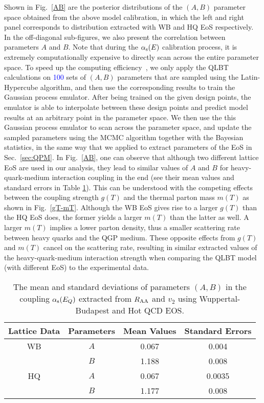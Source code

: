 \documentclass[aps,superscriptaddress,prc,twocolumn,nofootinbib]{revtex4}
\begin{document}
Shown in Fig.~\ref{AB} are the posterior distributions of the $(A, B)$ parameter space obtained from the above model calibration, in which the left and right panel corresponds to distribution extracted with WB and HQ EoS respectively. In the off-diagonal sub-figures, we also present the correlation between parameters $A$ and $B$.
Note that during the $\alpha_{\rm s}(E)$ calibration process, it is extremely computationally expensive to directly scan across the entire parameter space.
To speed up the computing efficiency~\cite{He:2018gks,Cao:2021keo}, we only apply the QLBT calculations on \textcolor{blue}{100} sets of $(A, B)$ parameters that are sampled using the Latin-Hypercube algorithm, and then use the corresponding results to train the Gaussian process emulator. After being trained on the given design points, the emulator is able to interpolate between these design points and predict model results at an arbitrary point in the parameter space.
We then use the this Gaussian process emulator to scan across the parameter space, and update the sampled parameters using the MCMC algorithm together with the Bayesian statistics, in the same way that we applied to extract parameters of the EoS in Sec.~\ref{sec:QPM}.
In Fig.~\ref{AB}, one can observe that although two different lattice EoS are used in our analysis, they lead to similar values of $A$ and $B$ for heavy-quark-medium interaction coupling in the end (see their mean values and standard errors in Table \ref{tab:4}). This can be understood with the competing effects between the coupling strength $g(T)$ and the thermal parton mass $m(T)$ as shown in Fig.~\ref{gT-mT}. Although the WB EoS gives rise to a larger $g(T)$ than the HQ EoS does, the former yields a larger $m(T)$ than the latter as well. A larger $m(T)$ implies a lower parton density, thus a smaller scattering rate between heavy quarks and the QGP medium. These opposite effects from $g(T)$ and $m(T)$ cancel on the scattering rate, resulting in similar extracted values of the heavy-quark-medium interaction strength when comparing the QLBT model (with different EoS) to the experimental data.



\begin{table}[htb]
\label{tab:4}
\centering
\vspace{-5pt}
\begin{tabular}{c|c|c|c}
 \hline
 Lattice Data & Parameters & Mean Values & Standard Errors  \\
 \hline
  WB   & $A$ & 0.067 & 0.004   \\
      & $B$ & 1.188 & 0.008   \\ \hline
  HQ   & $A$ & 0.067 & 0.0035  \\
  	  & $B$ & 1.177 & 0.008   \\
  \hline
\end{tabular}
	\caption{The mean and standard deviations of parameters $(A,B)$ in the coupling $\alpha_{\rm s}(E_Q)$ extracted from $R_{\rm AA}$ and $v_2$ using Wuppertal-Budapest and Hot QCD EOS.}
\end{table}
\end{document}
